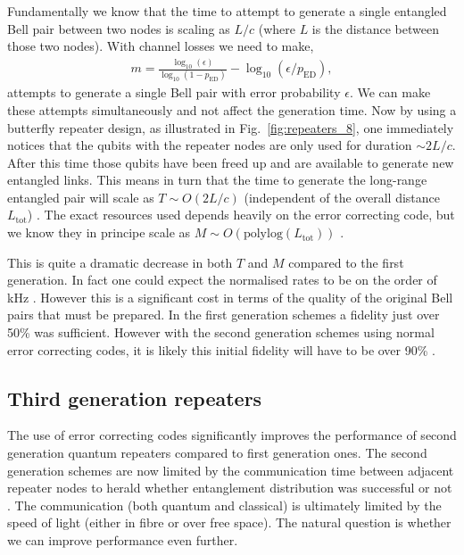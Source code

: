 Fundamentally we know that the time to attempt to generate a single entangled Bell pair between two nodes is scaling as $L/c$ (where $L$ is the distance between those two nodes). With channel losses we need to make,
\begin{align}
m=\frac{\log_{10} (\epsilon)}{\log_{10} (1-p_\mathrm{ED})} - \log_{10} (\epsilon / p_\mathrm{ED}),
\end{align}
attempts to generate a single Bell pair with error probability $\epsilon$. We can make these attempts simultaneously and not affect the generation time. Now by using a butterfly repeater design, as illustrated in Fig.~\ref{fig:repeaters_8}, one immediately notices that the qubits with the repeater nodes are only used for duration $\sim 2 L/c$. After this time those qubits have been freed up and are available to generate new entangled links. This means in turn that the time to generate the long-range entangled pair will scale as \mbox{$T\sim O(2L/c)$} (independent of the overall distance $L_\mathrm{tot}$) \cite{bib:jiang09, bib:munro10, bib:Muralidharan2016}. The exact resources used depends heavily on the error correcting code, but we know they in principe scale as \mbox{$M \sim O(\mathrm{polylog}(L_\mathrm{tot}))$} \cite{bib:Muralidharan2016}.

This is quite a dramatic decrease in both $T$ and $M$ compared to the first generation. In fact one could expect the normalised rates to be on the order of kHz \cite{bib:munro10}. However this is a significant cost in terms of the quality of the original Bell pairs that must be prepared. In the first generation schemes a fidelity just over 50\% was sufficient. However with the second generation schemes using normal error correcting codes, it is likely this initial fidelity will have to be over 90\% \cite{bib:jiang09, bib:munro10}. 

\subsection{Third generation repeaters}

The use of error correcting codes significantly improves the performance of second generation quantum repeaters compared to first generation ones. The second generation schemes are now limited by the communication time between adjacent repeater nodes to herald whether entanglement distribution was successful or not \cite{bib:munro10, bib:munro12}. The communication (both quantum and classical) is ultimately limited by the speed of light (either in fibre or over free space). The natural question is whether we can improve performance even further.

